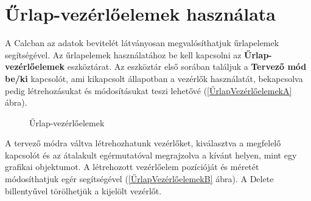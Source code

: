 \chapter{Űrlap-vezérlőelemek használata}
\thispagestyle{empty}

A Calcban az adatok bevitelét látványosan megvalósíthatjuk
űrlapelemek segítségével. Az űrlapelemek
használatához be kell kapcsolni az
\textbf{Űrlap-vezérlőelemek} eszköztárat. Az
eszköztár első sorában találjuk a \textbf{Tervező mód
be/ki} kapcsolót, ami kikapcsolt állapotban a vezérlők
használatát, bekapcsolva pedig létrehozásukat és
módosításukat teszi lehetővé (\ref{ŰrlapVezérlőelemekA} ábra). 

\begin{figure}[h!]
\centering
{}
\qquad
{}
\caption{Űrlap-vezérlőelemek}\label{ŰrlapVezérlőelemek}
\end{figure}

A tervező módra váltva létrehozhatunk vezérlőket,
kiválasztva a megfelelő kapcsolót és az  átalakult
egérmutatóval megrajzolva a kívánt helyen, mint egy grafikai
objektumot. A létrehozott  vezérlőelem pozícióját és
méretét módosíthatjuk egér segítségével (\ref{ŰrlapVezérlőelemekB} ábra).
A Delete billentyűvel törölhetjük a kijelölt
vezérlőt.

